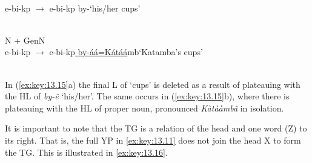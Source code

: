 \documentclass[output=paper]{langsci/langscibook}
\begin{document}
\ea\label{ex:key:13.15}
    \\
        e-bi-kp ${\rightarrow}$
        e-bi-kp by-\hfill‘his/her cups’\\
        \\\vspace{.75\baselineskip}
    \ex N + GenN\\
        e-bi-kp ${\rightarrow}$
        e-bi-kp\underline{ by-áá=Kátáá}mb\hfill‘Katamba’s cups’\\
        \\\vspace{.75\baselineskip}
    \z
\z
In (\ref{ex:key:13.15}a) the final L of ‘cups’ is deleted as a result of
plateauing with the HL of \emph{by-ê} ‘his/her’. The same occurs in
(\ref{ex:key:13.15}b), where there is plateauing with the HL of proper noun,
pronounced \emph{Kàtààmbâ} in isolation.

It is important to note that the \gls{TG} is a relation of the head and one
word (Z) to its right. That is, the full YP in \eqref{ex:key:13.11} does not join
the head X to form the \gls{TG}. This is illustrated in \eqref{ex:key:13.16}.
\end{document}
